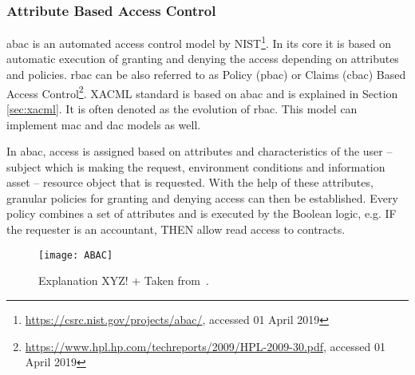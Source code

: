 \subsubsection{Attribute Based Access Control} \label{sec:sota-abac}

\acrfull{abac} is an automated access control model by NIST\footnote{\url{https://csrc.nist.gov/projects/abac/}, accessed 01 April 2019}. In its core it is based on automatic execution of granting and denying the access depending on attributes and policies. \acrshort{rbac} can be also referred to as Policy (\acrshort{pbac}) or Claims (\acrshort{cbac}) Based Access Control\footnote{\url{https://www.hpl.hp.com/techreports/2009/HPL-2009-30.pdf}, accessed 01 April 2019}. XACML standard is based on \acrshort{abac} and is explained in Section \ref{sec:xacml}. It is often denoted as the evolution of \acrshort{rbac}. This model can implement \acrshort{mac} and \acrshort{dac} models as well.

In \acrshort{abac}, access is assigned based on attributes and characteristics of the user – subject which is making the request, environment conditions and information asset – resource object that is requested. With the help of these attributes, granular policies for granting and denying access can then be established. Every policy combines a set of attributes and is executed by the Boolean logic, e.g. IF the requester is an accountant, THEN allow read access to contracts.

\begin{figure}[ht]
    \centering
    \texttt{[image: ABAC]}
    \caption{Explanation XYZ! + Taken from~\cite{AttributeABAC}.}
    \label{fig:ABAC_diagram_sota}
\end{figure}